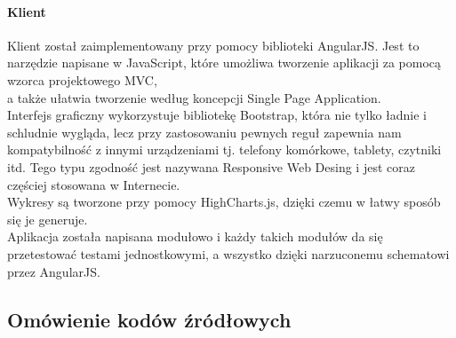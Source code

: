 \documentclass[10pt,titlepage]{article}
\begin{document}
\paragraph{Klient}
Klient został zaimplementowany przy pomocy biblioteki AngularJS. Jest to narzędzie napisane w JavaScript, które umożliwa tworzenie aplikacji za pomocą wzorca projektowego MVC,\\ a także ułatwia tworzenie według koncepcji Single Page Application.\\ Interfejs graficzny wykorzystuje bibliotekę Bootstrap, która nie tylko ładnie i schludnie wygląda, lecz przy zastosowaniu pewnych reguł zapewnia nam kompatybilność z innymi urządzeniami tj. telefony komórkowe, tablety, czytniki itd. Tego typu zgodność jest nazywana Responsive Web Desing i jest coraz częściej stosowana w Internecie.\\ Wykresy są tworzone przy pomocy HighCharts.js, dzięki czemu w łatwy sposób się je generuje.\\ Aplikacja została napisana modułowo i każdy takich modułów da się przetestować testami jednostkowymi, a wszystko dzięki narzuconemu schematowi przez AngularJS.
\subsection{Omówienie kodów źródłowych}
\end{document}
